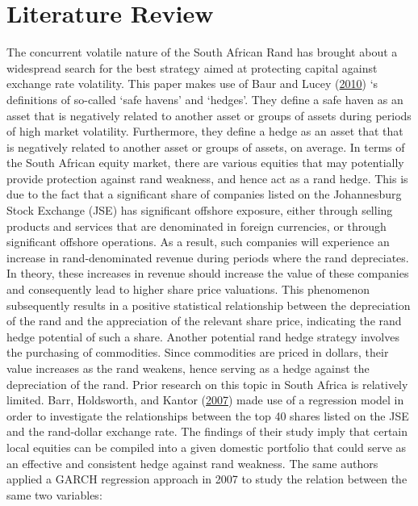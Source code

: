 \documentclass[11pt,preprint, authoryear]{elsarticle}
\numberwithin{equation}{section}
\numberwithin{figure}{section}
\numberwithin{table}{section}
\begin{document}
\section{\texorpdfstring{Literature Review
\label{Lit_Review}}{Literature Review }}\label{literature-review}

The concurrent volatile nature of the South African Rand has brought
about a widespread search for the best strategy aimed at protecting
capital against exchange rate volatility. This paper makes use of Baur
and Lucey (\protect\hyperlink{ref-baur2010}{2010}) `s definitions of
so-called `safe havens' and `hedges'. They define a safe haven as an
asset that is negatively related to another asset or groups of assets
during periods of high market volatility. Furthermore, they define a
hedge as an asset that that is negatively related to another asset or
groups of assets, on average. In terms of the South African equity
market, there are various equities that may potentially provide
protection against rand weakness, and hence act as a rand hedge. This is
due to the fact that a significant share of companies listed on the
Johannesburg Stock Exchange (JSE) has significant offshore exposure,
either through selling products and services that are denominated in
foreign currencies, or through significant offshore operations. As a
result, such companies will experience an increase in rand-denominated
revenue during periods where the rand depreciates. In theory, these
increases in revenue should increase the value of these companies and
consequently lead to higher share price valuations. This phenomenon
subsequently results in a positive statistical relationship between the
depreciation of the rand and the appreciation of the relevant share
price, indicating the rand hedge potential of such a share. Another
potential rand hedge strategy involves the purchasing of commodities.
Since commodities are priced in dollars, their value increases as the
rand weakens, hence serving as a hedge against the depreciation of the
rand. Prior research on this topic in South Africa is relatively
limited. Barr, Holdsworth, and Kantor
(\protect\hyperlink{ref-barr2007}{2007}) made use of a regression model
in order to investigate the relationships between the top 40 shares
listed on the JSE and the rand-dollar exchange rate. The findings of
their study imply that certain local equities can be compiled into a
given domestic portfolio that could serve as an effective and consistent
hedge against rand weakness. The same authors applied a GARCH regression
approach in 2007 to study the relation between the same two variables:
\end{document}
